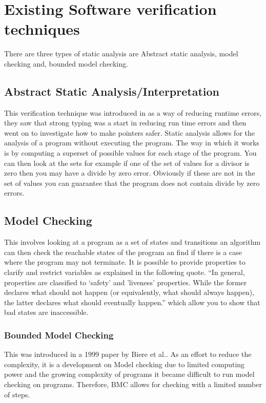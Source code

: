 \documentclass[a4paper,12pt]{scrartcl}
\begin{document}
	\section{Existing Software verification techniques}
	{
		There are three types of static analysis are Abstract static analysis, model checking and, bounded model checking\cite{DSilva2008}. 
		\subsection{Abstract Static Analysis/Interpretation}
		{
			This verification technique was introduced in \cite{Cousot1977} as a way of reducing runtime errors, they saw that strong typing was a start in reducing run time errors and then went on to investigate how to make pointers safer. Static analysis allows for the analysis of a program without executing the program. The way in which it works is by computing a superset of possible values for each stage of the program. You can then look at the sets for example if one of the set of values for a divisor is zero then you may have a divide by zero error. Obviously if these are not in the set of values you can guarantee that the program does not contain divide by zero errors.
		}
		\subsection{Model Checking}
		{
			This involves looking at a program as a set of states and transitions an algorithm can then check the reachable states of the program an find if there is a case where the program may not terminate\cite{DSilva2008}. It is possible to provide properties to clarify and restrict variables as explained in the following quote. \enquote{In general, properties are classified to ‘safety’ and ’liveness’ properties. While the former declares what should not happen (or equivalently, what should always happen), the latter declares what should eventually happen.}\cite{Biere2003} which allow you to show that bad states are inaccessible.
			\subsubsection{Bounded Model Checking}
			{
				This was introduced in a 1999 paper by Biere et al.\cite{Biere1999}. As an effort to reduce the complexity, it is a development on Model checking due to limited computing power and the growing complexity of programs it became difficult to run model checking on programs. Therefore, BMC allows for checking with a limited number of steps.
			}
		}

	}
	
\end{document}
